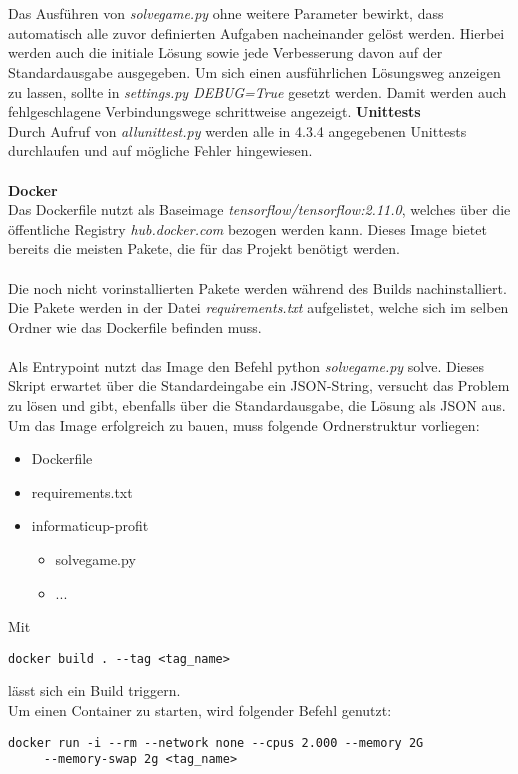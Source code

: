 \\\\
Das Ausführen von \textit{solve\textunderscore{}game.py} ohne weitere Parameter bewirkt, dass automatisch alle zuvor definierten Aufgaben nacheinander gelöst werden. Hierbei werden auch die initiale Lösung sowie jede Verbesserung davon auf der Standardausgabe ausgegeben. Um sich einen ausführlichen Lösungsweg anzeigen zu lassen, sollte in \textit{settings.py DEBUG=True} gesetzt werden. Damit werden auch fehlgeschlagene Verbindungswege schrittweise angezeigt.
\newpage
\textbf{Unittests}\\
Durch Aufruf von \textit{all\textunderscore{}unit\textunderscore{}test.py} werden alle in 4.3.4 angegebenen Unittests durchlaufen und auf mögliche Fehler hingewiesen.
\\\\
\textbf{Docker}\\
Das Dockerfile nutzt als Baseimage \textit{tensorflow/tensorflow:2.11.0}, welches über die öffentliche Registry \textit{hub.docker.com} bezogen werden kann. Dieses Image bietet bereits die meisten Pakete, die für das Projekt benötigt werden.
\\\\
Die noch nicht vorinstallierten Pakete werden während des Builds nachinstalliert. Die Pakete werden in der Datei \textit{requirements.txt} aufgelistet, welche sich im selben Ordner wie das Dockerfile befinden muss.
\\\\
Als Entrypoint nutzt das Image den Befehl python \textit{solve\textunderscore{}game.py} solve. Dieses Skript erwartet über die Standardeingabe ein JSON-String, versucht das Problem zu lösen und gibt, ebenfalls über die Standardausgabe, die Lösung als JSON aus.
\\
Um das Image erfolgreich zu bauen, muss folgende Ordnerstruktur vorliegen:
\begin{itemize}
	\item Dockerfile
	\item requirements.txt
	\item informaticup-profit
	\begin{itemize}
		\item solve\textunderscore{}game.py
		\item ...
	\end{itemize}
\end{itemize}

Mit 
\begin{verbatim}docker build . --tag <tag_name>\end{verbatim}
lässt sich ein Build triggern. 
\\
Um einen Container zu starten, wird folgender Befehl genutzt:
\begin{verbatim}docker run -i --rm --network none --cpus 2.000 --memory 2G
	 --memory-swap 2g <tag_name>\end{verbatim}

